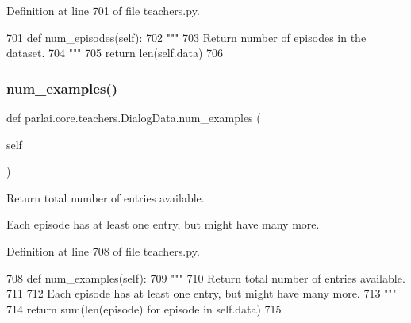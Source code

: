 Definition at line 701 of file teachers.\+py.


\begin{DoxyCode}
701     \textcolor{keyword}{def }num\_episodes(self):
702         \textcolor{stringliteral}{"""}
703 \textcolor{stringliteral}{        Return number of episodes in the dataset.}
704 \textcolor{stringliteral}{        """}
705         \textcolor{keywordflow}{return} len(self.data)
706 
\end{DoxyCode}
\mbox{\label{classparlai_1_1core_1_1teachers_1_1DialogData_a8deee9e9e45ae8162270bdcdfd7916b6}} 
\subsubsection{\texorpdfstring{num\+\_\+examples()}{num\_examples()}}
{\footnotesize\ttfamily def parlai.\+core.\+teachers.\+Dialog\+Data.\+num\+\_\+examples (\begin{DoxyParamCaption}\item[{}]{self }\end{DoxyParamCaption})}

\begin{DoxyVerb}Return total number of entries available.

Each episode has at least one entry, but might have many more.
\end{DoxyVerb}
 

Definition at line 708 of file teachers.\+py.


\begin{DoxyCode}
708     \textcolor{keyword}{def }num\_examples(self):
709         \textcolor{stringliteral}{"""}
710 \textcolor{stringliteral}{        Return total number of entries available.}
711 \textcolor{stringliteral}{}
712 \textcolor{stringliteral}{        Each episode has at least one entry, but might have many more.}
713 \textcolor{stringliteral}{        """}
714         \textcolor{keywordflow}{return} sum(len(episode) \textcolor{keywordflow}{for} episode \textcolor{keywordflow}{in} self.data)
715 
\end{DoxyCode}
\mbox{\label{classparlai_1_1core_1_1teachers_1_1DialogData_ada6f4dc4e2a8a84fba5f1e54d214d15e}} 
